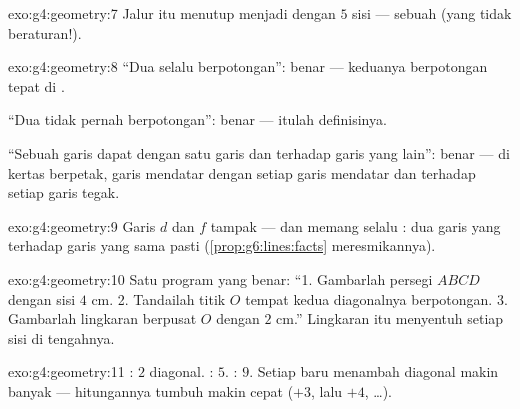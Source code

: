 \begin{solution}{exo:g4:geometry:7}
Jalur itu menutup menjadi  dengan $5$ sisi --- sebuah
 (yang tidak beraturan!).
\end{solution}

\begin{solution}{exo:g4:geometry:8}
``Dua  selalu berpotongan'': benar --- keduanya
berpotongan tepat di .

``Dua  tidak pernah berpotongan'': benar --- itulah definisinya.

``Sebuah garis dapat  dengan satu garis dan 
terhadap garis yang lain'': benar --- di kertas berpetak, garis
mendatar  dengan setiap garis mendatar dan  terhadap setiap garis tegak.
\end{solution}

\begin{solution}{exo:g4:geometry:9}
Garis $d$ dan $f$ tampak  --- dan memang selalu : dua
garis yang  terhadap garis yang sama pasti 
(\cref{prop:g6:lines:facts} meresmikannya).
\end{solution}

\begin{solution}{exo:g4:geometry:10}
Satu program yang benar: ``1. Gambarlah persegi $ABCD$ dengan sisi
$4$ cm. 2. Tandailah titik $O$ tempat kedua diagonalnya berpotongan.
3. Gambarlah lingkaran berpusat $O$ dengan  $2$ cm.''
Lingkaran itu menyentuh setiap sisi di tengahnya.
\end{solution}

\begin{solution}{exo:g4:geometry:11}
: $2$ diagonal. : $5$. : $9$. Setiap
 baru menambah diagonal makin banyak --- hitungannya
tumbuh makin cepat ($+3$, lalu $+4$, \dots).

\end{solution}
